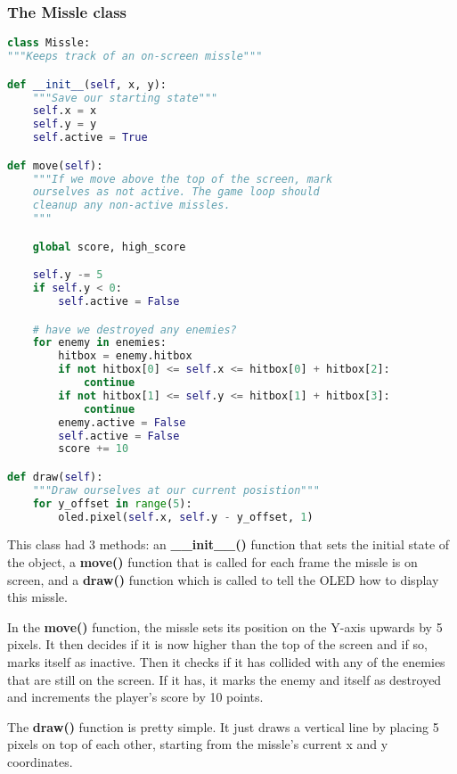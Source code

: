 \subsubsection{The Missle class}
\begin{lstlisting}[language=Python,caption=The Missle class]
class Missle:
"""Keeps track of an on-screen missle"""

def __init__(self, x, y):
    """Save our starting state"""
    self.x = x
    self.y = y
    self.active = True

def move(self):
    """If we move above the top of the screen, mark
    ourselves as not active. The game loop should
    cleanup any non-active missles.
    """

    global score, high_score

    self.y -= 5
    if self.y < 0:
        self.active = False

    # have we destroyed any enemies?
    for enemy in enemies:
        hitbox = enemy.hitbox
        if not hitbox[0] <= self.x <= hitbox[0] + hitbox[2]:
            continue
        if not hitbox[1] <= self.y <= hitbox[1] + hitbox[3]:
            continue
        enemy.active = False
        self.active = False
        score += 10

def draw(self):
    """Draw ourselves at our current posistion"""
    for y_offset in range(5):
        oled.pixel(self.x, self.y - y_offset, 1)
\end{lstlisting}

This class had 3 methods: an \textbf{\_\_init\_\_()} function that sets the initial state of the object,
a \textbf{move()} function that is called for each frame the missle is on screen, and a \textbf{draw()}
function which is called to tell the OLED how to display this missle.

In the \textbf{move()} function, the missle sets its position on the Y-axis upwards by 5 pixels. It then decides
if it is now higher than the top of the screen and if so, marks itself as inactive. Then it checks if it
has collided with any of the enemies that are still on the screen. If it has, it marks the enemy and
itself as destroyed and increments the player's score by 10 points.

The \textbf{draw()} function is pretty simple. It just draws a vertical line by placing 5 pixels on top of each
other, starting from the missle's current x and y coordinates.

